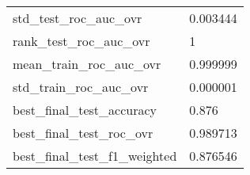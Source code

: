 \begin{tabular}{ll}
std\_test\_roc\_auc\_ovr        &                                           0.003444 \\
rank\_test\_roc\_auc\_ovr       &                                                  1 \\
mean\_train\_roc\_auc\_ovr      &                                           0.999999 \\
std\_train\_roc\_auc\_ovr       &                                           0.000001 \\
best\_final\_test\_accuracy    &                                              0.876 \\
best\_final\_test\_roc\_ovr     &                                           0.989713 \\
best\_final\_test\_f1\_weighted &                                           0.876546 \\
\bottomrule
\end{tabular}
